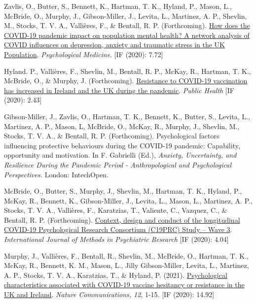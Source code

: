 \documentclass[12pt]{article}
\begin{document}
\begin{bibenum}
	\item Zavlis, O., Butter, S., Bennett, K., Hartman, T. K., Hyland, P., 
	Mason, L., McBride, O., Murphy, J., Gibson-Miller, J., Levita, L., 
	Martinez, A. P., Shevlin, M., Stocks, T. V. A., Vallières, F., 
	\& Bentall, R. P. (Forthcoming). 
		\href{https://doi.org/10.1017/S0033291721000635}{How does the COVID-19 
		pandemic impact on population mental health? A network analysis of 
		COVID influences on depression, anxiety and traumatic stress in the 
		UK Population}.
		\emph{Psychological Medicine}. [IF (2020): 7.72]
	
	\item Hyland. P., Vallières, F., Shevlin, M.,  Bentall, R. P., McKay, R., 
	Hartman, T. K., McBride, O., \& Murphy, J. (Forthcoming). 
		\href{https://doi.org/10.1016/j.puhe.2021.04.009}{Resistance to 
		COVID-19 vaccination has increased in Ireland and the UK during the pandemic}.
		\emph{Public Health} [IF (2020): 2.43]
	
	\item Gibson-Miller, J., Zavlis, O., Hartman, T. K., Bennett, K., Butter, S., 
	Levita, L., Martinez, A. P., Mason, L, McBride, O., McKay, R., Murphy, J., 
	Shevlin, M., Stocks, T. V. A., \& Bentall, R. P. (Forthcoming). 
		Psychological factors influencing protective behaviours during 
		the COVID-19 pandemic: Capability, opportunity and motivation. 
		In F. Gabrielli (Ed.), \textit{Anxiety, Uncertainty, and Resilience 
		During the Pandemic Period - Anthropological and Psychological 
		Perspectives.} London: IntechOpen.
	
	\item McBride, O., Butter, S., Murphy, J., Shevlin, M., Hartman, T. K., 
	Hyland, P., McKay, R., Bennett, K., Gibson-Miller, J.,  Levita, L., Mason, L., 
	Martinez, A. P.,  Stocks, T. V. A., Vallières, F., Karatzias, T., Valiente, C., 
	Vazquez, C., \& Bentall, R. P.  (Forthcoming). 
		\href{https://psyarxiv.com/kthfn/}{Context, design and conduct of 
		the longitudinal COVID-19 Psychological Research Consortium 
		(C19PRC) Study – Wave 3}.  
		\emph{International Journal of Methods in Psychiatric Research} [IF (2020): 4.04]
		
	\item Murphy, J., Vallières, F., Bentall, R., Shevlin, M.,  McBride, O., 
	Hartman, T. K., McKay, R., Bennett, K. M., Mason, L., Jilly Gibson-Miller,  
	Levita, L., Martinez, A. P., Stocks, T. V. A.,  Karatzias, T., \& Hyland, P. (2021).
		\href{https://doi.org/10.1038/s41467-020-20226-9}{Psychological characteristics 
		associated with COVID-19 vaccine hesitancy or resistance in the UK and Ireland}. 
		\emph{Nature Communications, 12}, 1-15. [IF (2020): 14.92]


\end{bibenum}
\end{document}
